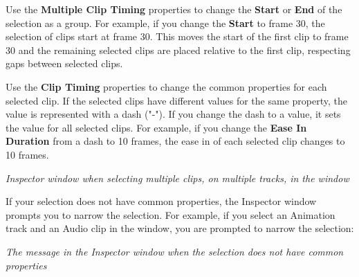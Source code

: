 \begin{DoxyItemize}
\item Use the {\bfseries{Multiple Clip Timing}} properties to change the {\bfseries{Start}} or {\bfseries{End}} of the selection as a group. For example, if you change the {\bfseries{Start}} to frame 30, the selection of clips start at frame 30. This moves the start of the first clip to frame 30 and the remaining selected clips are placed relative to the first clip, respecting gaps between selected clips.
\item Use the {\bfseries{Clip Timing}} properties to change the common properties for each selected clip. If the selected clips have different values for the same property, the value is represented with a dash ("{}-\/"{}). If you change the dash to a value, it sets the value for all selected clips. For example, if you change the {\bfseries{Ease In Duration}} from a dash to 10 frames, the ease in of each selected clip changes to 10 frames.
\end{DoxyItemize}



{\itshape Inspector window when selecting multiple clips, on multiple tracks, in the  window}

If your selection does not have common properties, the Inspector window prompts you to narrow the selection. For example, if you select an Animation track and an Audio clip in the  window, you are prompted to narrow the selection\+:



{\itshape The message in the Inspector window when the selection does not have common properties} 